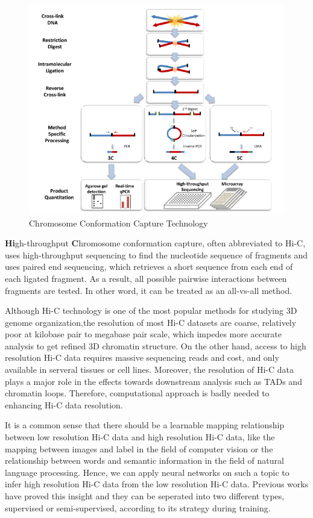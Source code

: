 \documentclass{article}
\begin{document}
\begin{figure}[H]
    \centering
    \includegraphics[scale=0.4]{./docs/Chromosome_Conformation_Capture_Technology.jpg}
    \caption{Chromosome Conformation Capture Technology}\label{3cstructure}
\end{figure}

\textbf{Hi}gh-throughput \textbf{C}hromosome conformation capture, often abbreviated to Hi-C\cite{hic}, uses high-throughput sequencing to find the nucleotide sequence of fragments and uses paired end sequencing, which retrieves a short sequence from each end of each ligated fragment. As a result, all possible pairwise interactions between fragments are tested. In other word, it can be treated as an all-vs-all method.

Although Hi-C technology is one of the most popular methods for studying 3D genome organization,the resolution of most Hi-C datasets are coarse, relatively poor at kilobase pair to megabase pair scale, which impedes more accurate analysis to get refined 3D chromatin structure. On the other hand, access to high resolution Hi-C data requires massive sequencing reads and cost, and only available in serveral tissues or cell lines. Moreover, the resolution of Hi-C data plays a major role in the effects towards downstream analysis such as TADs and chromatin loops. Therefore, computational approach is badly needed to enhancing Hi-C data resolution. 

It is a common sense that there should be a learnable mapping relationship between low resolution Hi-C data and high resolution Hi-C data, like the mapping between images and label in the field of computer vision or the relationship between words and semantic information in the field of natural language processing. Hence, we can apply neural networks on such a topic to infer high resolution Hi-C data from the low resolution Hi-C data. Previous works have proved this insight and they can be seperated into two different types, supervised or semi-supervised, according to its strategy during training.
\end{document}
